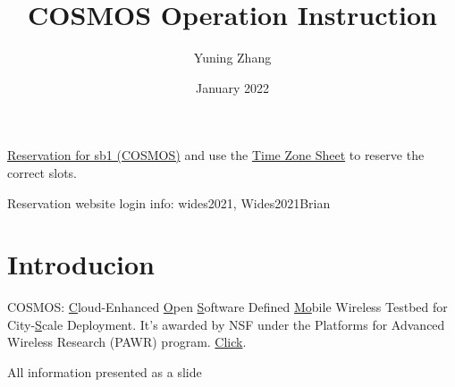\documentclass{article}
\title{COSMOS Operation Instruction}
\author{Yuning Zhang}
\date{January 2022}
\begin{document}
\maketitle

\href{https://wiki.cosmos-lab.org/cPanel/controlPanel/start}{Reservation for sb1 (COSMOS)} and use the \href{https://docs.google.com/spreadsheets/d/1xPYrlGE3fdgp6nT6kSQy_u71vQ1-qCfW/edit?usp=sharing&ouid=105630052024591065957&rtpof=true&sd=true}{Time Zone Sheet} to reserve the correct slots.  

Reservation website login info: wides2021, Wides2021Brian

\tableofcontents

\section{Introducion}
    COSMOS: \underline{C}loud-Enhanced \underline{O}pen \underline{S}oftware Defined \underline{Mo}bile Wireless Testbed for City-\underline{S}cale Deployment. It's awarded by NSF under the Platforms for Advanced Wireless Research (PAWR) program. \href{http://www.winlab.rutgers.edu/projects/cosmos/Index.html}{Click}. 
    
    All information presented as a slide 
\end{document}
